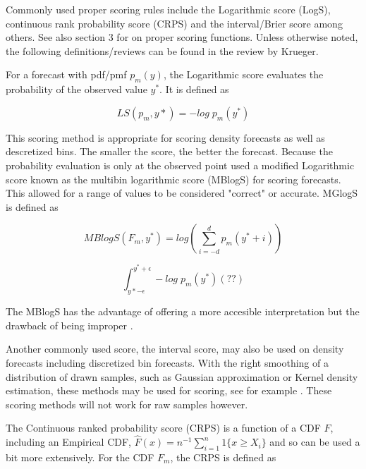 \documentclass{article}\usepackage[]{graphicx}\usepackage[]{color}
\begin{document}
Commonly used proper scoring rules include the Logarithmic score (LogS), 
continuous rank probability score (CRPS) \cite{hersbach2000decomposition}
\cite{alves2013ncep} and the interval/Brier 
score \cite{gneiting2007strictly} among 
others. See also \cite{gneiting2014probabilistic}
section 3 for on proper scoring functions. Unless otherwise noted, the following
definitions/reviews can be found in the review by Krueger.

For a forecast with pdf/pmf $p_m(y)$, the Logarithmic score evaluates the 
probability of the observed value $y^*$. It is defined as

\begin{equation}
  LS(p_m,y*) = -log\;p_m(y^*)
\end{equation}

This scoring method is appropriate for scoring density forecasts as well as 
descretized bins. The smaller the score, the better the forecast.
Because the probability evaluation is only at the observed 
point \cite{reich2019accuracy} used a modified Logarithmic score 
known as the multibin logarithmic score (MBlogS) for scoring
forecasts. This allowed for a range of values to be considered "correct" or 
accurate. MGlogS is defined as

\begin{equation}
  MBlogS(F_m, y^*) = log(\sum_{i=-d}^{d} p_m(y^* + i))
\end{equation}

\begin{equation}
  \int_{y*-\epsilon}^{y^*+\epsilon} -log\;p_m(y^*) (??)
\end{equation}

The MBlogS has the advantage of offering a more accesible interpretation but the
drawback of being improper \cite{bracher2021evaluating}.

Another commonly used score, the interval score, may also be used on density 
forecasts including discretized bin forecasts. With the right smoothing of
a distribution of drawn samples, 
such as Gaussian approximation or Kernel density estimation, these methods may 
be used for scoring, see for example \cite{krueger2016probabilistic}.
These scoring methods will not work for raw samples however.

The Continuous ranked probability score (CRPS) is a function of a CDF $F$, 
including an Empirical CDF, $\hat{F}(x) = n^{-1} \sum_{i=1}^n 1\{x \geq X_i\}$
and so 
can be used a bit more extensively. For the CDF $F_m$, the CRPS is defined as
\end{document}
